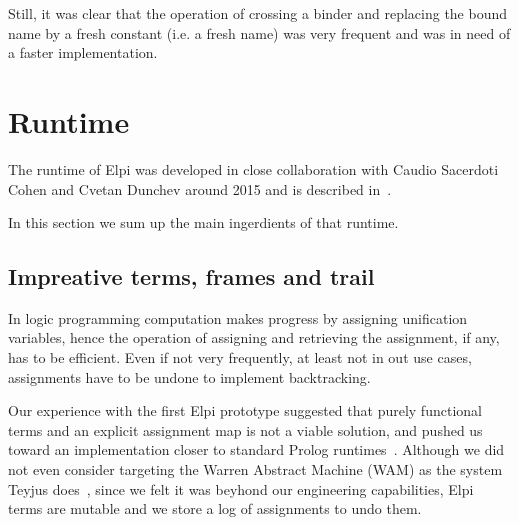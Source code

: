 \documentclass[a4paper, 11pt]{book}
\begin{document}
Still, it was clear that the operation of crossing a binder
and replacing the bound name by a fresh constant (i.e. a fresh name) was
very frequent and was in need of a faster implementation.

\newcommand{\theotherfragment}{\ensuremath{L_{\lambda}}\xspace}
\newcommand{\thefragment}{\ensuremath{L_{\lambda}^{\beta}}\xspace}
\newtheorem{definition}{Definition}

\section{Runtime}

The runtime of Elpi was developed in close collaboration with Caudio
Sacerdoti Cohen and Cvetan Dunchev around 2015 and is described in~\cite{dunchev15lpar}.

In this section we sum up the main ingerdients of that runtime.

\subsection{Impreative terms, frames and trail}\label{sec:terms}

In logic programming computation makes progress by assigning unification
variables, hence the operation of assigning and retrieving the assignment, if any,
has to be efficient. Even if not very frequently, at least not in out use cases,
assignments have to be undone to implement backtracking.

Our experience with the first Elpi prototype suggested that purely functional
terms and an explicit assignment map is not a viable solution, and pushed us
toward an implementation closer to standard Prolog runtimes~\cite{wam}.
Although we did not even consider targeting the Warren Abstract Machine (WAM)
as the system Teyjus does~\cite{teyjus}, since we felt it was beyhond our
engineering capabilities, Elpi terms are mutable and we store
a log of assignments to undo them.
\end{document}
